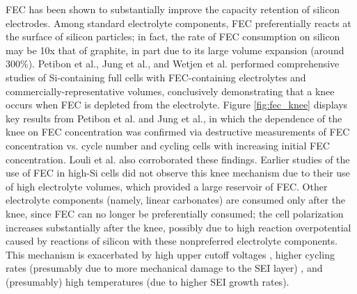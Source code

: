 \documentclass[journal=jpclcd,manuscript=article]{achemso}
\begin{document}
FEC has been shown to substantially improve the capacity retention of silicon electrodes.\cite{choi_effect_2006, etacheri_effect_2012}
Among standard electrolyte components, FEC preferentially reacts at the surface of silicon particles; in fact, the rate of FEC consumption on silicon may be 10x that of graphite, in part due to its large volume expansion (around 300\%).\cite{wetjen_differentiating_2017}
Petibon et al.\cite{petibon_studies_2016},
Jung et al.\cite{jung_consumption_2016},
and Wetjen et al.\cite{wetjen_differentiating_2017}
performed comprehensive studies of Si-containing full cells with FEC-containing electrolytes and commercially-representative volumes,
conclusively demonstrating that a knee occurs when FEC is depleted from the electrolyte.
Figure \ref{fig:fec_knee} displays key results from Petibon et al.\cite{petibon_studies_2016} and
Jung et al.\cite{jung_consumption_2016}, in which the dependence of the knee on FEC concentration was confirmed via destructive measurements of FEC concentration vs. cycle number\cite{petibon_studies_2016} and cycling cells with increasing initial FEC concentration\cite{jung_consumption_2016}.
Louli et al.\cite{louli_operando_2019} also corroborated these findings.
Earlier studies of the use of FEC in high-Si cells\cite{choi_effect_2006, etacheri_effect_2012} did not observe this knee mechanism due to their use of high electrolyte volumes, which provided a large reservoir of FEC.
Other electrolyte components (namely, linear carbonates) are consumed only after the knee, since FEC can no longer be preferentially consumed\cite{petibon_studies_2016}; the cell polarization increases substantially after the knee\cite{petibon_studies_2016, jung_consumption_2016, wetjen_differentiating_2017}, possibly due to high reaction overpotential caused by reactions of silicon with these nonpreferred electrolyte components.
This mechanism is exacerbated by high upper cutoff voltages \cite{petibon_studies_2016}, higher cycling rates (presumably due to more mechanical damage to the SEI layer) \cite{petibon_studies_2016}, and (presumably) high temperatures (due to higher SEI growth rates).
\end{document}
